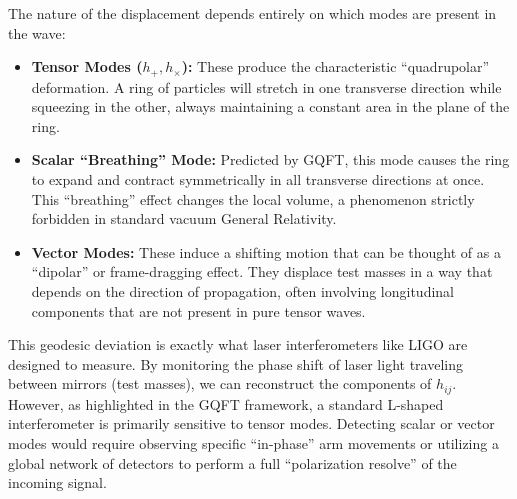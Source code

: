 The nature of the displacement depends entirely on which modes are present in the wave:
\begin{itemize}
  \item \textbf{Tensor Modes ($h_+, h_\times$):} These produce the characteristic ``quadrupolar'' deformation. A ring of particles will stretch in one transverse direction while squeezing in the other, always maintaining a constant area in the plane of the ring.
  \item \textbf{Scalar ``Breathing'' Mode:} Predicted by GQFT, this mode causes the ring to expand and contract symmetrically in all transverse directions at once. This ``breathing'' effect changes the local volume, a phenomenon strictly forbidden in standard vacuum General Relativity.
  \item \textbf{Vector Modes:} These induce a shifting motion that can be thought of as a ``dipolar'' or frame-dragging effect. They displace test masses in a way that depends on the direction of propagation, often involving longitudinal components that are not present in pure tensor waves.
\end{itemize}

This geodesic deviation is exactly what laser interferometers like LIGO are designed to measure. By monitoring the phase shift of laser light traveling between mirrors (test masses), we can reconstruct the components of $h_{ij}$. However, as highlighted in the GQFT framework, a standard L-shaped interferometer is primarily sensitive to tensor modes. Detecting scalar or vector modes would require observing specific ``in-phase'' arm movements or utilizing a global network of detectors to perform a full ``polarization resolve'' of the incoming signal.

